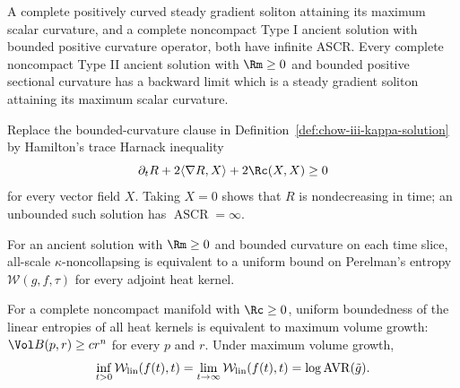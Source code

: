 \begin{theorem}
\label{thm:chow-iii-infinite-ascr}
A complete positively curved steady gradient soliton attaining its maximum
scalar curvature, and a complete noncompact Type I ancient solution with
bounded positive curvature operator, both have infinite ASCR.  Every complete
noncompact Type II ancient solution with $\Rm\ge0$ and bounded positive
sectional curvature has a backward limit which is a steady gradient soliton
attaining its maximum scalar curvature.
\end{theorem}

\begin{definition}
\label{def:chow-iii-kappa-harnack}
Replace the bounded-curvature clause in Definition~\ref{def:chow-iii-kappa-solution}
by Hamilton's trace Harnack inequality
\[
\partial_tR+2\langle\nabla R,X\rangle+2\Rc(X,X)\ge0
\]
for every vector field $X$.  Taking $X=0$ shows that $R$ is nondecreasing in
time; an unbounded such solution has $\operatorname{ASCR}=\infty$.
\end{definition}

\begin{claim}
\label{clm:chow-iii-entropy-kappa}
For an ancient solution with $\Rm\ge0$ and bounded curvature on each time
slice, all-scale $\kappa$-noncollapsing is equivalent to a uniform bound on
Perelman's entropy $\mathcal W(g,f,\tau)$ for every adjoint heat kernel.
\end{claim}

\begin{theorem}
\label{thm:chow-iii-linear-entropy-volume}
For a complete noncompact manifold with $\Rc\ge0$, uniform boundedness of the
linear entropies of all heat kernels is equivalent to maximum volume growth:
$\Vol B(p,r)\ge cr^n$ for every $p$ and $r$.  Under maximum volume growth,
\[
\inf_{t>0}\mathcal W_{\rm lin}(f(t),t)=\lim_{t\to\infty}\mathcal W_{\rm lin}(f(t),t)
=\log\operatorname{AVR}(\tilde g).
\]
\end{theorem}

